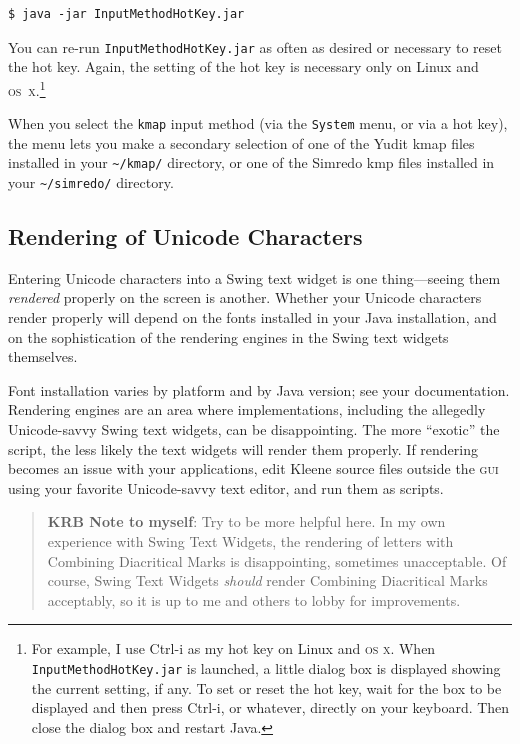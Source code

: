 \documentclass[letterpaper,12pt]{article}
\newcommand{\acro}{\textsc}
\begin{document}
\begin{Verbatim}[fontsize=\small]
$ java -jar InputMethodHotKey.jar
\end{Verbatim}

\noindent
You can re-run \texttt{InputMethodHotKey.jar} as often as desired
or necessary to reset the hot key.
Again, the setting of the hot key is necessary only on Linux and
\acro{os~x}.\footnote{For example, I use Ctrl-i as my hot key on Linux
and \acro{os x}.  When \texttt{InputMethodHotKey.jar} is launched, a
little dialog box is displayed showing the current setting, if any.  To
set or reset the hot key, wait for the box to be displayed and then press
Ctrl-i, or whatever, directly on your keyboard. Then close the dialog box
and restart Java.}

When you select the \texttt{kmap} input method (via the \texttt{System}
menu, or via a hot key), the menu lets you make a secondary selection of
one of the Yudit kmap files installed in your \texttt{\~{}/kmap/}
directory, or one of the Simredo kmp files installed in your
\texttt{\~{}/simredo/} directory.

\subsection{Rendering of Unicode Characters}

Entering Unicode characters into a Swing text widget is one
thing---seeing them \emph{rendered} properly on the screen is another.
Whether your Unicode characters render properly will depend on the fonts
installed in your Java installation, and on the sophistication of the
rendering engines in the Swing text widgets themselves.

Font installation varies by platform and by Java version; see your
documentation.  Rendering engines are an area where
implementations, including the allegedly Unicode-savvy Swing text
widgets, can be disappointing.  The more ``exotic'' the script,
the less likely the text widgets will render them properly.  If
rendering becomes an issue with your applications, edit 
Kleene source files outside the \acro{gui} using your favorite Unicode-savvy text editor,
and run them as scripts.

\begin{quote}
\textbf{KRB Note to myself}: Try to be more helpful here.  In my own
experience with Swing Text Widgets, the rendering of letters with
Combining Diacritical Marks is disappointing, sometimes unacceptable.  Of
course, Swing Text Widgets \emph{should} render Combining Diacritical
Marks acceptably, so it is up to me and others to lobby for improvements.
\end{quote}
\end{document}
